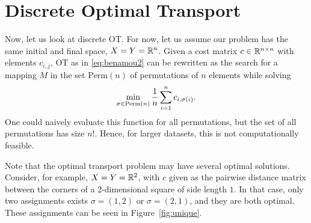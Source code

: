 \section{Discrete Optimal Transport}
Now, let us look at discrete OT. For now, let us assume our problem has the same initial and final space, $X = Y = \mathbb{R}^n$. Given a cost matrix $c \in \mathbb{R}^{n\times n}$ with elements $c_{i,j}$, OT as in \eqref{eq:benamou2} can be rewritten as the search for a mapping $M$ in the set $\text{Perm}(n)$ of permutations of $n$ elements while solving 
\begin{equation*}
	\min_{\sigma \in \text{Perm}(n)} \frac{1}{n} \sum_{i=1}^n c_{i, \sigma(i)}. 
	\label{eq:optimalmatching}
\end{equation*}
One could naively evaluate this function for all permutations, but the set of all permutations has size $n!$. Hence, for larger datasets, this is not computationally feasible.
\vspace{0.3cm}
\begin{remark}[Uniqueness]
	Note that the optimal transport problem may have several optimal solutions. Consider, for example, $X = Y = \mathbb{R}^2$, with $c$ given as the pairwise distance matrix between the corners of a 2-dimensional square of side length $1$. In that case, only two assignments exists $\sigma = (1, 2)$ or $\sigma = (2, 1)$, and they are both optimal. These assignments can be seen in Figure~\ref{fig:unique}. 
\end{remark}
\vspace{0.3cm}
